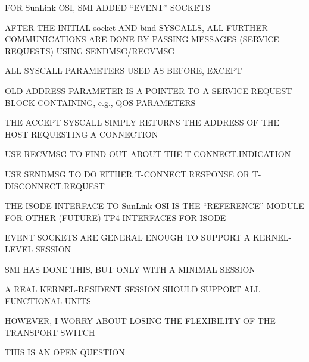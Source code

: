\begin{bwslide}

\begin{nrtc}
\item	FOR SunLink OSI, SMI ADDED ``EVENT'' SOCKETS

\item	AFTER THE INITIAL socket AND bind SYSCALLS, ALL FURTHER COMMUNICATIONS
	ARE DONE BY PASSING MESSAGES (SERVICE REQUESTS) USING SENDMSG/RECVMSG
    \begin{nrtc}
    \item	ALL SYSCALL PARAMETERS USED AS BEFORE, EXCEPT

    \item	OLD ADDRESS PARAMETER IS A POINTER TO A SERVICE REQUEST BLOCK
		CONTAINING, e.g., QOS PARAMETERS
    \end{nrtc}

\item	THE ACCEPT SYSCALL SIMPLY RETURNS THE ADDRESS OF THE HOST REQUESTING
	A CONNECTION
    \begin{nrtc}
    \item	USE RECVMSG TO FIND OUT ABOUT THE T-CONNECT.INDICATION

    \item	USE SENDMSG TO DO EITHER T-CONNECT.RESPONSE OR
		T-DISCONNECT.REQUEST
    \end{nrtc}
\end{nrtc}
\end{bwslide}


\begin{bwslide}

\begin{nrtc}
\item	THE ISODE INTERFACE TO SunLink OSI IS THE ``REFERENCE'' MODULE
	FOR OTHER (FUTURE) TP4 INTERFACES FOR ISODE

\item	EVENT SOCKETS ARE GENERAL ENOUGH TO SUPPORT A KERNEL-LEVEL SESSION
    \begin{nrtc}
    \item	SMI HAS DONE THIS, BUT ONLY WITH A MINIMAL SESSION

    \item	A REAL KERNEL-RESIDENT SESSION SHOULD SUPPORT ALL FUNCTIONAL
		UNITS
    \end{nrtc}

\item	HOWEVER, I WORRY ABOUT LOSING THE FLEXIBILITY OF THE TRANSPORT SWITCH
    \begin{nrtc}
    \item	THIS IS AN OPEN QUESTION
    \end{nrtc}
\end{nrtc}
\end{bwslide}


